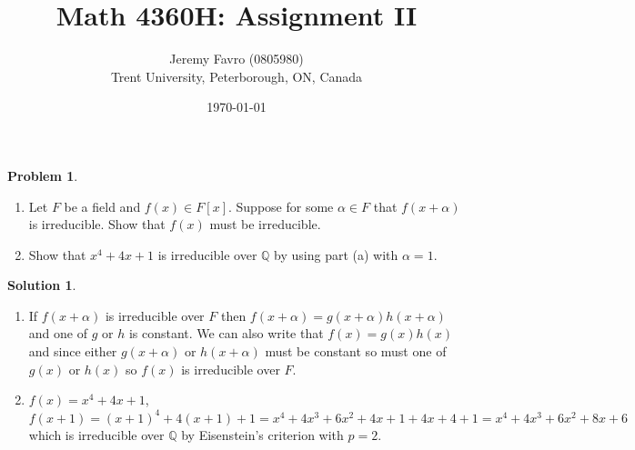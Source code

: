 \documentclass[10pt]{article}
\title{Math 4360H: Assignment II}
\author{Jeremy Favro (0805980) \\ Trent University, Peterborough, ON, Canada}
\date{\today}
\theoremstyle{definition}
\newtheorem{problem}{Problem}
\newtheorem{soln}{Solution}
\begin{document}
\maketitle

\begin{problem}~
\begin{enumerate}[label=(\alph*)]
  \item Let $F$ be a field and $f(x)\in F[x]$. Suppose for some $\alpha\in F$ that
        $f(x+\alpha)$ is irreducible. Show that $f (x)$ must be irreducible.
  \item Show that $x^4 + 4x + 1$ is irreducible over $\mathbb{Q}$ by using part (a)
        with $\alpha=1$.
\end{enumerate}
\end{problem}
\begin{soln}~
  \begin{enumerate}[label=(\alph*)]
    \item If $f(x+\alpha)$ is irreducible over $F$ then $f(x+\alpha)=g(x+\alpha)h(x+\alpha)$ and one of $g$ or $h$ is constant. We can also write that
          $f(x)=g(x)h(x)$ and since either $g(x+\alpha)$ or $h(x+\alpha)$ must be constant so must one of $g(x)$ or $h(x)$ so $f(x)$ is irreducible over $F$.
    \item $f(x)=x^4 + 4x + 1$, $f(x+1)=(x+1)^4 + 4(x+1) + 1=x^4+4x^3+6x^2+4x+1+4x+4+1=x^4+4x^3+6x^2+8x+6$ which is irreducible over $\mathbb{Q}$
          by Eisenstein's criterion with $p=2$.
  \end{enumerate}
\end{soln}
\end{document}

